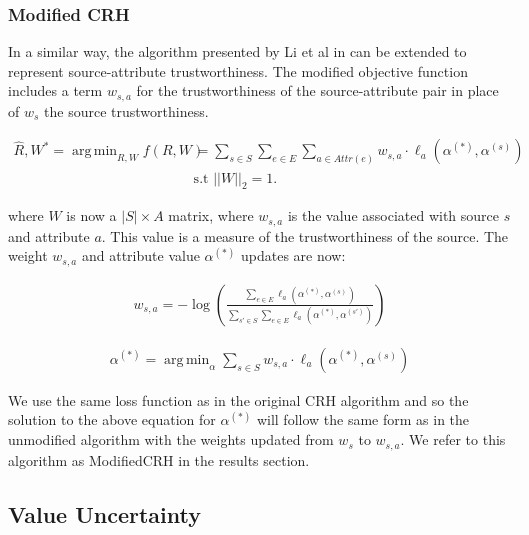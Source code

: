 \documentclass{acm_proc_article-sp}
\DeclareMathOperator*{\argmin}{arg\,min}
\begin{document}
\subsubsection{Modified CRH}

In a similar way, the algorithm presented by Li et al in \cite{li:resolving} can be extended to represent source-attribute trustworthiness. The modified objective function includes a term $w_{s,a}$ for the trustworthiness of the source-attribute pair in place of $w_s$ the source trustworthiness. 

\begin{align}
\hat{R}, W^* = \argmin_{R,W} f(R, W) & = \sum_{s \in S} \sum_{e \in E} \sum_{a \in Attr(e)} w_{s,a} \cdot \ell_a(\alpha^{(*)}, \alpha^{(s)}) \\
& \text{s.t } ||W||_2 =1. \nonumber 
\end{align}

where  $W$ is now a $|S|\times A$ matrix, where $w_{s,a}$ is the value associated with source $s$ and attribute $a$. This value is a measure of the trustworthiness of the source. The weight $w_{s,a}$ and attribute value $\alpha^{(*)}$ updates are now: 


\begin{align}
w_{s,a} = - \log \left ( \frac{\sum_{e \in E} \ell_a(\alpha^{(*)}, \alpha^{(s)})}{\sum_{s' \in S} \sum_{e \in E}  \ell_a(\alpha^{(*)}, \alpha^{(s')})} \right )
\end{align}

\begin{align}
\alpha^{(*)} = \argmin_\alpha \sum_{s \in S} w_{s,a} \cdot \ell_a(\alpha^{(*)}, \alpha^{(s)})
\end{align}

We use the same loss function as in the original CRH algorithm and so the solution to the above equation for $\alpha^{(*)}$ will follow the same form as in the unmodified algorithm with the weights updated from $w_s$ to $w_{s,a}$. We refer to this algorithm as {\sc ModifiedCRH} in the results section. 

\subsection{Value Uncertainty}
\end{document}
